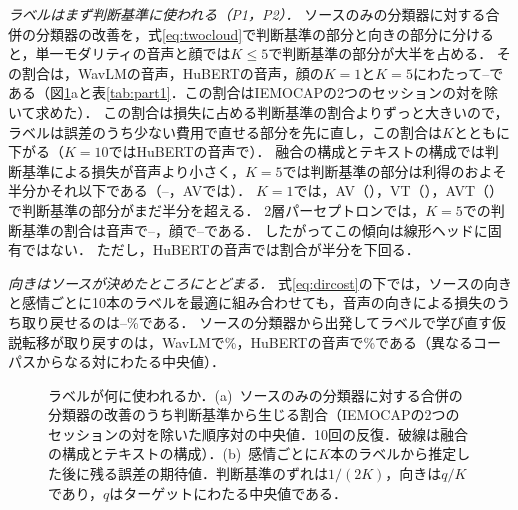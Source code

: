 \emph{ラベルはまず判断基準に使われる（P1，P2）．}
ソースのみの分類器に対する合併の分類器の改善を，式\eqref{eq:twocloud}で判断基準の部分と向きの部分に分けると，単一モダリティの音声と顔では$K \le 5$で判断基準の部分が大半を占める．
その割合は，WavLMの音声，HuBERTの音声，顔の$K=1$と$K=5$にわたって--である（図\ref{fig:thresholdshare}aと表\ref{tab:part1}．この割合はIEMOCAPの2つのセッションの対を除いて求めた）．
この割合は損失に占める判断基準の割合よりずっと大きいので，ラベルは誤差のうち少ない費用で直せる部分を先に直し，この割合は$K$とともに下がる（$K=10$ではHuBERTの音声で）．
融合の構成とテキストの構成では判断基準による損失が音声より小さく，$K=5$では判断基準の部分は利得のおよそ半分かそれ以下である（--，AVでは）．
$K=1$では，AV（），VT（），AVT（）で判断基準の部分がまだ半分を超える．
2層パーセプトロンでは，$K=5$での判断基準の割合は音声で--，顔で--である．
したがってこの傾向は線形ヘッドに固有ではない．
ただし，HuBERTの音声では割合が半分を下回る．

\emph{向きはソースが決めたところにとどまる．}
式\eqref{eq:dircost}の下では，ソースの向きと感情ごとに10本のラベルを最適に組み合わせても，音声の向きによる損失のうち取り戻せるのは--\%である．
ソースの分類器から出発してラベルで学び直す仮説転移が取り戻すのは，WavLMで\%，HuBERTの音声で\%である（異なるコーパスからなる対にわたる中央値）．

\begin{figure}[t]
\centering
{}
\caption{ラベルが何に使われるか．(a)~ソースのみの分類器に対する合併の分類器の改善のうち判断基準から生じる割合（IEMOCAPの2つのセッションの対を除いた順序対の中央値．10回の反復．破線は融合の構成とテキストの構成）．(b)~感情ごとに$K$本のラベルから推定した後に残る誤差の期待値．判断基準のずれは$1/(2K)$，向きは$q/K$であり，$q$はターゲットにわたる中央値である．}
\label{fig:thresholdshare}
\end{figure}

